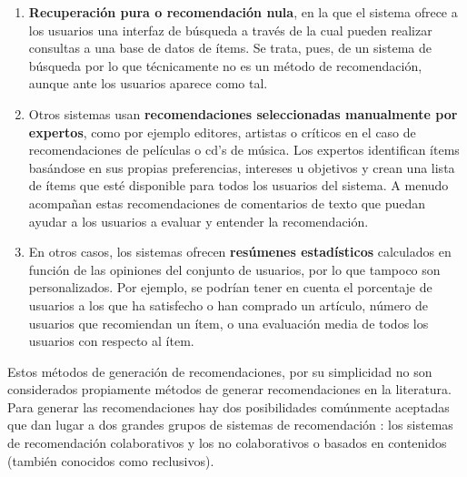 \documentclass[12pt,letterpaper,oneside] {memoir}
\begin{document}
\begin{enumerate}
\item \textbf{Recuperación pura o recomendación nula}, en la que el sistema ofrece a los usuarios una interfaz de búsqueda a través de la cual pueden realizar consultas a una base de datos de ítems. Se trata, pues, de un sistema de búsqueda por lo que técnicamente no es un método de recomendación, aunque ante los usuarios aparece como tal.
\item Otros sistemas usan \textbf{recomendaciones seleccionadas manualmente por expertos}, como por ejemplo editores, artistas o críticos en el caso de recomendaciones de películas o cd's de música. Los expertos identifican ítems basándose en sus propias preferencias, intereses u objetivos y crean una lista de ítems que esté disponible para todos los usuarios del sistema. A menudo acompañan estas recomendaciones de comentarios de texto que puedan ayudar a los usuarios a evaluar y entender la recomendación.
\item En otros casos, los sistemas ofrecen \textbf{resúmenes estadísticos} calculados en función de las opiniones del conjunto de usuarios, por lo que tampoco son personalizados. Por ejemplo, se podrían tener en cuenta el porcentaje de usuarios a los que ha satisfecho o han comprado un artículo, número de usuarios que recomiendan un ítem, o una evaluación media de todos los usuarios con respecto al ítem.
\end{enumerate}

Estos métodos de generación de recomendaciones, por su simplicidad no son considerados propiamente métodos de generar recomendaciones en la literatura. Para generar las recomendaciones hay dos posibilidades comúnmente aceptadas que dan lugar a dos grandes grupos de sistemas de recomendación \citep{Yager2003, Porcel2004}: los sistemas de recomendación colaborativos y los no colaborativos o basados en contenidos (también conocidos como reclusivos).
\end{document}
